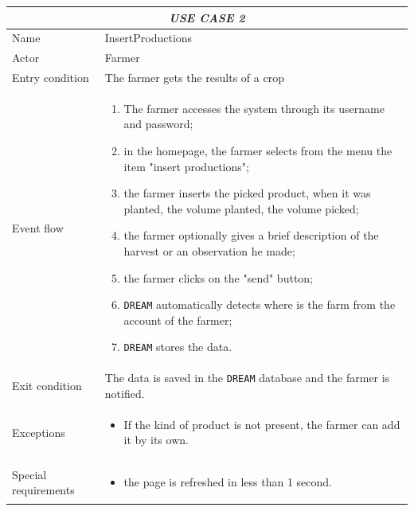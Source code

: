 \documentclass{article}
\begin{document}
\centering
\begin{tabular}{|p{3.5cm}|m{8cm}|}
 \hline
 \multicolumn{2}{|c|}{\emph{USE CASE 2}} \\
 \hline
 Name & InsertProductions\\
 \hline
 Actor & Farmer\\
 \hline
 Entry condition & The farmer gets the results of a crop\\
 \hline
 Event flow & \begin{enumerate}
    \item The farmer accesses the system through its username and password;
    \item in the homepage, the farmer selects from the menu the item "insert productions";
    \item the farmer inserts the picked product, when it was planted, the volume planted, the volume picked;
    \item the farmer optionally gives a brief description of the harvest or an observation he made;
    \item the farmer clicks on the "send" button;
    \item \verb|DREAM| automatically detects where is the farm from the account of the farmer;
    \item \verb|DREAM| stores the data.
 \end{enumerate}\\
 \hline
 Exit condition & The data is saved in the \verb|DREAM| database and the farmer is notified.\\
 \hline
 Exceptions & \begin{itemize}
     \item If the kind of product is not present, the farmer can add it by its own.
 \end{itemize}\\
 \hline
 Special requirements & \begin{itemize}
     \item the page is refreshed in less than 1 second.
 \end{itemize}\\
 \hline
\end{tabular}
\end{document}
